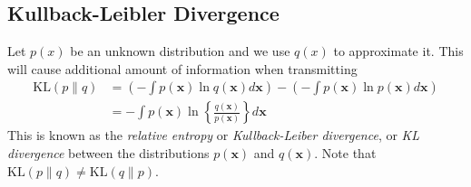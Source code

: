 \documentclass{article}
\begin{document}
        \subsection{Kullback-Leibler Divergence}
            Let $p(x)$ be an unknown distribution and we use $q(x)$ to approximate it. This will cause additional amount of information when transmitting
            \begin{align*}
                \mathrm{KL}(p\|q)&=\left(-\int p(\mathbf{x})\ln q(\mathbf{x})d\mathbf{x}\right) - \left(-\int p(\mathbf{x})\ln p(\mathbf{x})d\mathbf{x}\right)\\
                                 &=-\int p(\mathbf{x})\ln \left\{\frac{q(\mathbf{x})}{p(\mathbf{x})}\right\}d\mathbf{x}
            \end{align*}
            This is known as the \textit{relative entropy} or \textit{Kullback-Leiber divergence}, or \textit{KL divergence} between the distributions $p(\mathbf{x})$ and $q(\mathbf{x})$. Note that $\mathrm{KL}(p\|q)\neq\mathrm{KL}(q\|p)$.
\end{document}
